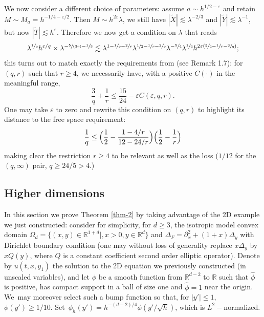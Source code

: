 \documentclass[JEP,XML,SOM,Unicode,NoEqCountersInSection,NoFloatCountersInSection,published]{cedram}
\newcommand{\spfrac}[2]{\sfrac{#1}{(#2)}}
\theoremstyle{plain}
\theoremstyle{definition}
\begin{document}
\medskip
We now consider a different choice of parameters: assume $a\sim h^{1/2-\varepsilon}$ and retain $M\sim M_{a}=h^{-1/4-\varepsilon/2}$. Then $M\sim h^{2\varepsilon}\lambda$, we still have $|\tilde X|\lesssim \lambda^{-2/3}$ and $|\tilde Y|\lesssim \lambda^{-1}$, but now $|\tilde T|\lesssim h^{\varepsilon}$. Therefore we now get a condition on $\lambda$ that reads
\[
\lambda^{\sfrac 1 q}h^{\varepsilon/q} \times \lambda^{-\spfrac 5{3r}-\sfrac 1 3}
\lesssim \lambda^{1-\sfrac 1 q-\sfrac 2 r} \lambda^{\sfrac 1 2 -\sfrac 1 r -\sfrac 2 q} \lambda^{-\sfrac 5 4} \lambda^{\sfrac 1 {4}}h^{2\varepsilon(\sfrac 3 4 -\sfrac 1 r -\sfrac 3q)};
\]
this turns out to match exactly the requirements from \cite{doi} (see Remark 1.7): for $(q,r)$ such that $r\geq 4$, we necessarily have, with a positive $C(\cdot)$ in the meaningful range,
\[
\frac 3 q +\frac 1 r \leq \frac {15} {24}-\varepsilon C(\varepsilon,q,r).
\]
One may take $\varepsilon$ to zero and rewrite this condition on $(q,r)$ to highlight its distance to the free space requirement:
\begin{equation*}
\label{eq:doi2d}
\frac 1 q \leq \Bigl(\frac 1 2 -\frac {1-4/r}{12-24/r}\Bigr) \Bigl(\frac 1 2 -\frac 1 r\Bigr)
\end{equation*}
making clear the restriction $r\geq 4$ to be relevant as well as the loss ($1/12$ for the $(q,\infty)$ pair, \eg $q\geq 24/5>4$.)

\subsection{Higher dimensions}
In this section we prove Theorem \ref{thm-2} by taking advantage of the 2D example we just constructed: consider for simplicity, for $d\geq 3$, the isotropic model convex domain $\Omega_d=\{(x,y)\in\mathbb{R}^{1+d}|, x>0,y\in\mathbb{R}^{d}\}$ and
$\Delta_F=\partial^{2}_{x}+(1+x)\Delta_{y}$ with Dirichlet boundary condition (one may without loss of generality replace $x\Delta_{y}$ by $xQ(y)$, where $Q$ is a constant coefficient second order elliptic operator). Denote by $u(t,x,y_{1})$ the solution to the 2D equation we previously constructed (in unscaled variables), and let $\phi$ be a smooth function from $\mathbb{R}^{d-2}$ to $\mathbb{R}$ such that $\hat \phi$ is positive, has compact support in a ball of size one and $\hat \phi=1$ near the origin. We~may moreover select such a bump function so that, for $|y'|\leq 1$, $\phi(y')\geq 1/10$. Set~$\phi_{h}(y')= h^{-(d-2)/4}\phi(y'/\sqrt h)$, which is $L^{2}-$normalized.
\end{document}
